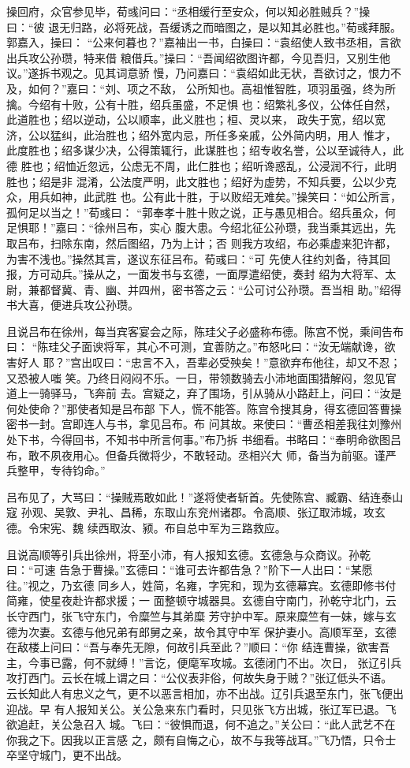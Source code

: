 操回府，众官参见毕，荀彧问曰：“丞相缓行至安众，何以知必胜贼兵？”操曰：“彼
退无归路，必将死战，吾缓诱之而暗图之，是以知其必胜也。”荀彧拜服。郭嘉入，操曰：
“公来何暮也？”嘉袖出一书，白操曰：“袁绍使人致书丞相，言欲出兵攻公孙瓒，特来借
粮借兵。”操曰：“吾闻绍欲图许都，今见吾归，又别生他议。”遂拆书观之。见其词意骄
慢，乃问嘉曰：“袁绍如此无状，吾欲讨之，恨力不及，如何？”嘉曰：“刘、项之不敌，
公所知也。高祖惟智胜，项羽虽强，终为所擒。今绍有十败，公有十胜，绍兵虽盛，不足惧
也：绍繁礼多仪，公体任自然，此道胜也；绍以逆动，公以顺率，此义胜也；桓、灵以来，
政失于宽，绍以宽济，公以猛纠，此治胜也；绍外宽内忌，所任多亲戚，公外简内明，用人
惟才，此度胜也；绍多谋少决，公得策辄行，此谋胜也；绍专收名誉，公以至诚待人，此德
胜也；绍恤近忽远，公虑无不周，此仁胜也；绍听谗惑乱，公浸润不行，此明胜也；绍是非
混淆，公法度严明，此文胜也；绍好为虚势，不知兵要，公以少克众，用兵如神，此武胜
也。公有此十胜，于以败绍无难矣。”操笑曰：“如公所言，孤何足以当之！”荀彧曰：
“郭奉孝十胜十败之说，正与愚见相合。绍兵虽众，何足惧耶！”嘉曰：“徐州吕布，实心
腹大患。今绍北征公孙瓒，我当乘其远出，先取吕布，扫除东南，然后图绍，乃为上计；否
则我方攻绍，布必乘虚来犯许都，为害不浅也。”操然其言，遂议东征吕布。荀彧曰：“可
先使人往约刘备，待其回报，方可动兵。”操从之，一面发书与玄德，一面厚遣绍使，奏封
绍为大将军、太尉，兼都督冀、青、幽、并四州，密书答之云：“公可讨公孙瓒。吾当相
助。”绍得书大喜，便进兵攻公孙瓒。

且说吕布在徐州，每当宾客宴会之际，陈珪父子必盛称布德。陈宫不悦，乘间告布曰：
“陈珪父子面谀将军，其心不可测，宜善防之。”布怒叱曰：“汝无端献谗，欲害好人
耶？”宫出叹曰：“忠言不入，吾辈必受殃矣！”意欲弃布他往，却又不忍；又恐被人嗤
笑。乃终日闷闷不乐。一日，带领数骑去小沛地面围猎解闷，忽见官道上一骑驿马，飞奔前
去。宫疑之，弃了围场，引从骑从小路赶上，问曰：“汝是何处使命？”那使者知是吕布部
下人，慌不能答。陈宫令搜其身，得玄德回答曹操密书一封。宫即连人与书，拿见吕布。布
问其故。来使曰：“曹丞相差我往刘豫州处下书，今得回书，不知书中所言何事。”布乃拆
书细看。书略曰：“奉明命欲图吕布，敢不夙夜用心。但备兵微将少，不敢轻动。丞相兴大
师，备当为前驱。谨严兵整甲，专待钧命。”

吕布见了，大骂曰：“操贼焉敢如此！”遂将使者斩首。先使陈宫、臧霸、结连泰山寇
孙观、吴敦、尹礼、昌稀，东取山东兖州诸郡。令高顺、张辽取沛城，攻玄德。令宋宪、魏
续西取汝、颍。布自总中军为三路救应。

且说高顺等引兵出徐州，将至小沛，有人报知玄德。玄德急与众商议。孙乾曰：“可速
告急于曹操。”玄德曰：“谁可去许都告急？”阶下一人出曰：“某愿往。”视之，乃玄德
同乡人，姓简，名雍，字宪和，现为玄德幕宾。玄德即修书付简雍，使星夜赴许都求援；一
面整顿守城器具。玄德自守南门，孙乾守北门，云长守西门，张飞守东门，令糜竺与其弟糜
芳守护中军。原来糜竺有一妹，嫁与玄德为次妻。玄德与他兄弟有郎舅之亲，故令其守中军
保护妻小。高顺军至，玄德在敌楼上问曰：“吾与奉先无隙，何故引兵至此？”顺曰：“你
结连曹操，欲害吾主，今事已露，何不就缚！”言讫，便麾军攻城。玄德闭门不出。次日，
张辽引兵攻打西门。云长在城上谓之曰：“公仪表非俗，何故失身于贼？”张辽低头不语。
云长知此人有忠义之气，更不以恶言相加，亦不出战。辽引兵退至东门，张飞便出迎战。早
有人报知关公。关公急来东门看时，只见张飞方出城，张辽军已退。飞欲追赶，关公急召入
城。飞曰：“彼惧而退，何不追之。”关公曰：“此人武艺不在你我之下。因我以正言感
之，颇有自悔之心，故不与我等战耳。”飞乃悟，只令士卒坚守城门，更不出战。

